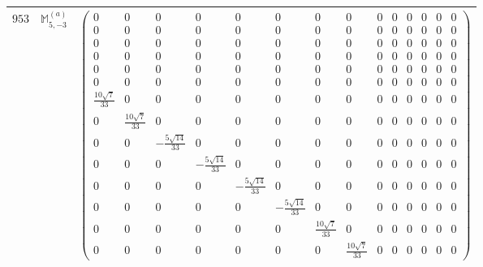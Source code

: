 \documentclass[fleqn,8pt,landscape]{jsarticle}
\begin{document}
\begin{center}
\begin{longtable}{ccc}
$ 953 $ & $ \mathbb{M}_{5,-3}^{(a)} $ & $ \begin{pmatrix} 0 & 0 & 0 & 0 & 0 & 0 & 0 & 0 & 0 & 0 & 0 & 0 & 0 & 0 \\ 0 & 0 & 0 & 0 & 0 & 0 & 0 & 0 & 0 & 0 & 0 & 0 & 0 & 0 \\ 0 & 0 & 0 & 0 & 0 & 0 & 0 & 0 & 0 & 0 & 0 & 0 & 0 & 0 \\ 0 & 0 & 0 & 0 & 0 & 0 & 0 & 0 & 0 & 0 & 0 & 0 & 0 & 0 \\ 0 & 0 & 0 & 0 & 0 & 0 & 0 & 0 & 0 & 0 & 0 & 0 & 0 & 0 \\ 0 & 0 & 0 & 0 & 0 & 0 & 0 & 0 & 0 & 0 & 0 & 0 & 0 & 0 \\ \frac{10 \sqrt{7}}{33} & 0 & 0 & 0 & 0 & 0 & 0 & 0 & 0 & 0 & 0 & 0 & 0 & 0 \\ 0 & \frac{10 \sqrt{7}}{33} & 0 & 0 & 0 & 0 & 0 & 0 & 0 & 0 & 0 & 0 & 0 & 0 \\ 0 & 0 & - \frac{5 \sqrt{14}}{33} & 0 & 0 & 0 & 0 & 0 & 0 & 0 & 0 & 0 & 0 & 0 \\ 0 & 0 & 0 & - \frac{5 \sqrt{14}}{33} & 0 & 0 & 0 & 0 & 0 & 0 & 0 & 0 & 0 & 0 \\ 0 & 0 & 0 & 0 & - \frac{5 \sqrt{14}}{33} & 0 & 0 & 0 & 0 & 0 & 0 & 0 & 0 & 0 \\ 0 & 0 & 0 & 0 & 0 & - \frac{5 \sqrt{14}}{33} & 0 & 0 & 0 & 0 & 0 & 0 & 0 & 0 \\ 0 & 0 & 0 & 0 & 0 & 0 & \frac{10 \sqrt{7}}{33} & 0 & 0 & 0 & 0 & 0 & 0 & 0 \\ 0 & 0 & 0 & 0 & 0 & 0 & 0 & \frac{10 \sqrt{7}}{33} & 0 & 0 & 0 & 0 & 0 & 0 \end{pmatrix} $ \\ \hline

\end{longtable}
\end{center}
\end{document}
